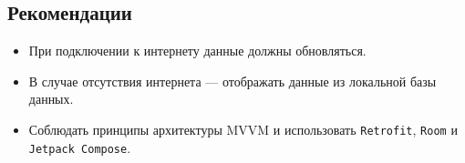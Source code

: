 \subsection{Рекомендации}
\begin{itemize}
  \item При подключении к интернету данные должны обновляться.
  \item В случае отсутствия интернета — отображать данные из локальной базы данных.
  \item Соблюдать принципы архитектуры MVVM и использовать \texttt{Retrofit}, \texttt{Room} и \texttt{Jetpack Compose}.
\end{itemize}
